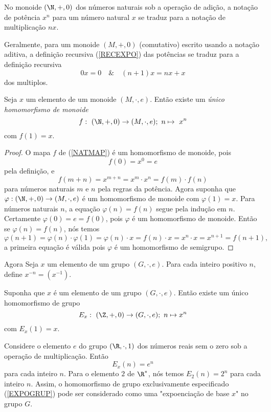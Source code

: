       No monoide $(\N , +, 0)$ dos números naturais sob a operação de adição, a notação de potência $x^{n}$ para um número natural $x$ se traduz para a notação de multiplicação $nx$.

      Geralmente, para um monoide $(M, +, 0)$ (comutativo) escrito usando a notação aditiva, a definição recursiva (\ref{RECEXPO}) das potências se traduz para a definição recursiva
      $$0x = 0\quad \&\quad (n+1)x = nx+x$$
      dos multiplos.

      \begin{theorem}
         Seja $x$ um elemento de um monoide $(M, \cdot, e)$. Então existe um \emph{único homomorfismo de monoide}
         \begin{equation}\label{NATMAP}
            f:\ (\N, +, 0) \to (M,\cdot, e);\ n \mapsto\ x^{n}
         \end{equation}
         com $f(1) = x.$
         \begin{proof}
            O mapa $f$ de (\ref{NATMAP}) é um homomorfismo de monoide, pois $$f(0) = x^{0} = e$$ pela definição, e $$f(m+n) = x^{m+n} = x^{m} \cdot x^{n} = f(m) \cdot f(n)$$ para números naturais $m$ e $n$ pela regras da potência.
            Agora suponha que $\varphi: (\N, +, 0) \to (M, \cdot , e)$ é um homomorfismo de monoide com $\varphi(1) = x$. Para números naturais $n$, a equação $\varphi(n) = f(n)$ segue pela indução em $n$. Certamente $\varphi(0) = e = f(0)$, pois $\varphi$ é um homomorfismo de monoide. Então se $\varphi(n) = f(n)$, nós temos 
            $$\varphi(n + 1) = \varphi(n) \cdot \varphi(1) = \varphi(n) \cdot x = f(n) \cdot x = x^{n} \cdot x = x^{n+1} = f(n + 1),$$
            a primeira equação é válida pois $\varphi$ é um homomorfismo de semigrupo.
         \end{proof}
      \end{theorem}
      Agora Seja $x$ um elemento de um grupo $(G,\cdot , e)$. Para cada inteiro positivo $n$, define $x^{-n} = (x^{-1})$. 
      \begin{theorem}
         Suponha que $x$ é um elemento de um grupo $(G,\cdot, e)$. Então existe um único homomorfismo de grupo
         \begin{equation}\label{EXPOGRUP}
            E_{x}:\ (\Z, +, 0) \to (G, \cdot, e);\ n \mapsto x^{n}
         \end{equation}
         com $E_{x}(1) = x.$
      \end{theorem}
      \begin{exmp}[Exponenciação]
         Considere o elemento $e$ do grupo $(\R, \cdot , 1)$ dos números reais sem o zero sob a operação de multiplicação. Então $$E_{x}(n) = e^{n}$$
         para cada inteiro $n$. Para o elemento $2$ de $\R^{*}$, nós temos $E_{2}(n) = 2^{n}$ para cada inteiro $n$. Assim, o homomorfismo de grupo exclusivamente especificado (\ref{EXPOGRUP}) pode ser considerado como uma "expoenciação de base $x$" no grupo $G$.
      \end{exmp}
